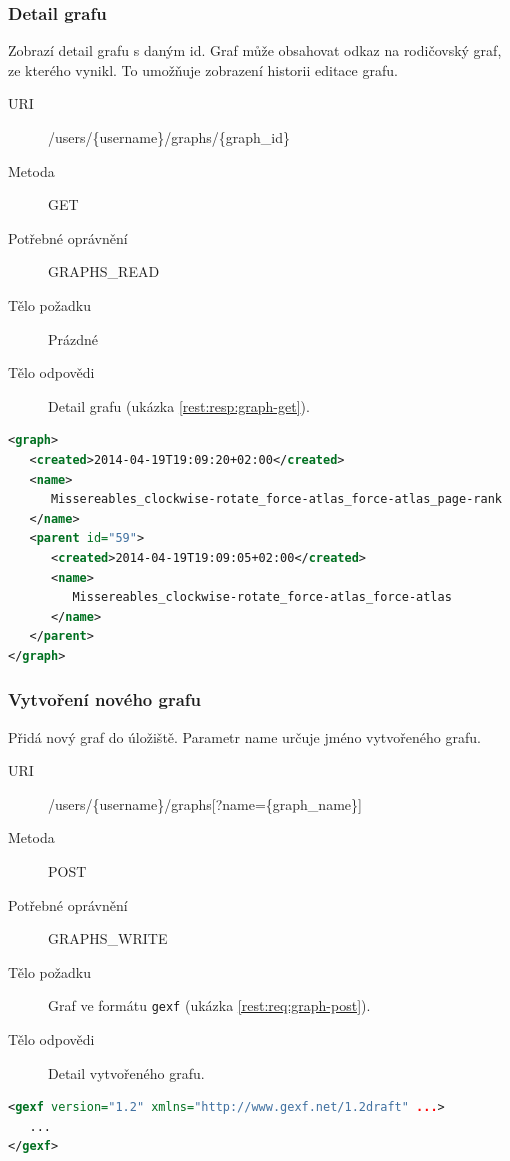 \documentclass[thesis=M,czech]{FITthesis}[2014/05/6]
\begin{document}
\subsubsection{Detail grafu}
Zobrazí detail grafu s daným id. Graf může obsahovat odkaz na rodičovský graf, ze kterého vynikl. To umožňuje zobrazení historii editace grafu.
\begin{description}
  \item[URI] /users/\{username\}/graphs/\{graph\_id\}
  \item[Metoda] GET
  \item[Potřebné oprávnění] GRAPHS\_READ
  \item[Tělo požadku] Prázdné
  \item[Tělo odpovědi] Detail grafu (ukázka \ref{rest:resp:graph-get}).
\end{description}

\begin{lstlisting}[caption=Tělo odpovědi zdroje /users/\{username\}/graphs/\{graph\_id\} (GET), label=rest:resp:graph-get, language=xml]
<graph>
   <created>2014-04-19T19:09:20+02:00</created>
   <name>
      Missereables_clockwise-rotate_force-atlas_force-atlas_page-rank
   </name>
   <parent id="59">
      <created>2014-04-19T19:09:05+02:00</created>
      <name>
         Missereables_clockwise-rotate_force-atlas_force-atlas
      </name>
   </parent>
</graph>
\end{lstlisting}  

\subsubsection{Vytvoření nového grafu}
Přidá nový graf do úložiště. Parametr name určuje jméno vytvořeného grafu.
\begin{description}
  \item[URI] /users/\{username\}/graphs[?name=\{graph\_name\}]
  \item[Metoda] POST
  \item[Potřebné oprávnění] GRAPHS\_WRITE
  \item[Tělo požadku] Graf ve formátu \texttt{gexf} (ukázka \ref{rest:req:graph-post}).
  \item[Tělo odpovědi] Detail vytvořeného grafu.
\end{description}

\begin{lstlisting}[caption=Tělo požadavku zdroje /users/\{username\}/graphs (POST), label=rest:req:graph-post, language=xml]
<gexf version="1.2" xmlns="http://www.gexf.net/1.2draft" ...>
   ...
</gexf>
\end{lstlisting} 
\end{document}
